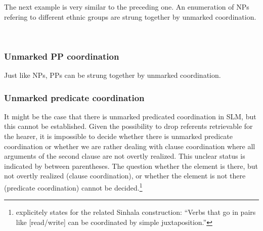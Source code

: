 The next example is very similar to the preceding one. An enumeration of NPs refering to different ethnic groups are strung together by unmarked coordination.

 \\

\subsubsection{Unmarked PP coordination}\label{sec:constr:UnmarkedPPcoordination}

Just like NPs, PPs can be strung together by unmarked coordination.


\subsubsection{Unmarked predicate coordination}\label{sec:constr:Unmarkedpredicatecoordination}
It might be the case that there is unmarked predicated coordination in SLM, but this cannot be established.
Given the possibility to drop referents retrievable for the hearer, it is impossible to decide whether there is unmarked predicate coordination or whether we are rather dealing with clause coordination where all arguments of the second clause are not overtly realized. This unclear status is indicated by \zero{} between parentheses. The question whether the element is there, but not overtly realized (clause coordination), or whether the element is not there (predicate coordination) cannot be decided.\footnote{\citet[206]{Karunatillake2004} explicitely states for the related Sinhala construction: ``Verbs that go in pairs like [read/write] can be coordinated by simple juxtaposition.''}
 
